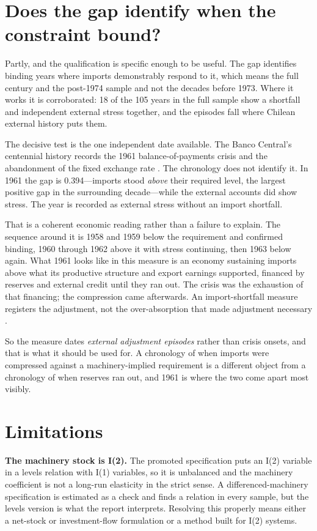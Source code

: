 \documentclass[11pt]{article}
\begin{document}
\FloatBarrier
\section{Does the gap identify when the constraint bound?}

Partly, and the qualification is specific enough to be useful. The gap identifies binding years where imports demonstrably respond to it, which means the full century and the post-1974 sample and not the decades before 1973. Where it works it is corroborated: 18 of the 105 years in the full sample show a shortfall and independent external stress together, and the episodes fall where Chilean external history puts them.

The decisive test is the one independent date available. The Banco Central's centennial history records the 1961 balance-of-payments crisis and the abandonment of the fixed exchange rate \citep{bcch2025}. The chronology does not identify it. In 1961 the gap is 0.394---imports stood \emph{above} their required level, the largest positive gap in the surrounding decade---while the external accounts did show stress. The year is recorded as external stress without an import shortfall.

That is a coherent economic reading rather than a failure to explain. The sequence around it is 1958 and 1959 below the requirement and confirmed binding, 1960 through 1962 above it with stress continuing, then 1963 below again. What 1961 looks like in this measure is an economy sustaining imports above what its productive structure and export earnings supported, financed by reserves and external credit until they ran out. The crisis was the exhaustion of that financing; the compression came afterwards. An import-shortfall measure registers the adjustment, not the over-absorption that made adjustment necessary \citep{thirlwall1982,morenobrid2003}.

So the measure dates \emph{external adjustment episodes} rather than crisis onsets, and that is what it should be used for. A chronology of when imports were compressed against a machinery-implied requirement is a different object from a chronology of when reserves ran out, and 1961 is where the two come apart most visibly.

\FloatBarrier
\section{Limitations}

\textbf{The machinery stock is I(2).} The promoted specification puts an I(2) variable in a levels relation with I(1) variables, so it is unbalanced and the machinery coefficient is not a long-run elasticity in the strict sense. A differenced-machinery specification is estimated as a check and finds a relation in every sample, but the levels version is what the report interprets. Resolving this properly means either a net-stock or investment-flow formulation or a method built for I(2) systems.
\end{document}
